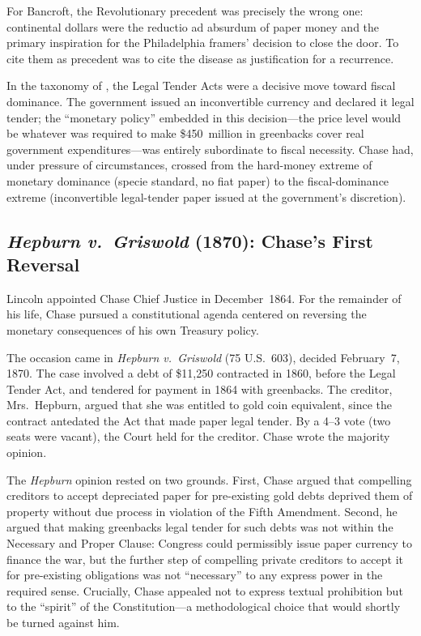 \documentclass[12pt]{article}
\begin{document}
For Bancroft, the Revolutionary precedent was precisely the wrong one:
continental dollars were the reductio ad absurdum of paper money and the
primary inspiration for the Philadelphia framers' decision to close the
door.  To cite them as precedent was to cite the disease as justification
for a recurrence.

In the taxonomy of \citet{Sargent2011}, the Legal Tender Acts were a
decisive move toward fiscal dominance.  The government issued an
inconvertible currency and declared it legal tender; the ``monetary
policy'' embedded in this decision---the price level would be whatever
was required to make \$450~million in greenbacks cover real government
expenditures---was entirely subordinate to fiscal necessity.  Chase had,
under pressure of circumstances, crossed from the hard-money extreme of
monetary dominance (specie standard, no fiat paper) to the
fiscal-dominance extreme (inconvertible legal-tender paper issued at the
government's discretion).

\subsection{\textit{Hepburn v.\ Griswold} (1870): Chase's First
             Reversal}

Lincoln appointed Chase Chief Justice in December~1864.  For the
remainder of his life, Chase pursued a constitutional agenda centered on
reversing the monetary consequences of his own Treasury policy.

The occasion came in \textit{Hepburn v.\ Griswold} (75 U.S.\ 603),
decided February~7, 1870.  The case involved a debt of \$11,250
contracted in 1860, before the Legal Tender Act, and tendered for
payment in 1864 with greenbacks.  The creditor, Mrs.\ Hepburn, argued
that she was entitled to gold coin equivalent, since the contract
antedated the Act that made paper legal tender.  By a 4--3 vote (two
seats were vacant), the Court held for the creditor.  Chase wrote the
majority opinion.

The \textit{Hepburn} opinion rested on two grounds.  First, Chase argued
that compelling creditors to accept depreciated paper for pre-existing
gold debts deprived them of property without due process in violation
of the Fifth Amendment.  Second, he argued that making greenbacks legal
tender for such debts was not within the Necessary and Proper Clause:
Congress could permissibly issue paper currency to finance the war, but
the further step of compelling private creditors to accept it for
pre-existing obligations was not ``necessary'' to any express power in
the required sense.  Crucially, Chase appealed not to express textual
prohibition but to the ``spirit'' of the Constitution---a methodological
choice that would shortly be turned against him.
\end{document}
